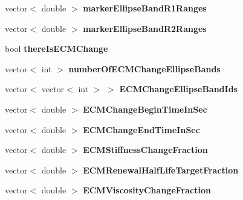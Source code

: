 \begin{DoxyCompactItemize}
\item 
\hypertarget{classSimulation_a4c294d56e7e1dacef4b4143ccfa445cf}{}vector$<$ double $>$ {\bfseries marker\+Ellipse\+Band\+R1\+Ranges}\label{classSimulation_a4c294d56e7e1dacef4b4143ccfa445cf}

\item 
\hypertarget{classSimulation_ac133c25002b7bc31291b013e36d5d861}{}vector$<$ double $>$ {\bfseries marker\+Ellipse\+Band\+R2\+Ranges}\label{classSimulation_ac133c25002b7bc31291b013e36d5d861}

\item 
\hypertarget{classSimulation_aa715adde27080a9c1e52f4428070d408}{}bool {\bfseries there\+Is\+E\+C\+M\+Change}\label{classSimulation_aa715adde27080a9c1e52f4428070d408}

\item 
\hypertarget{classSimulation_af267c5ade70459cfffcf17f2a01ad74b}{}vector$<$ int $>$ {\bfseries number\+Of\+E\+C\+M\+Change\+Ellipse\+Bands}\label{classSimulation_af267c5ade70459cfffcf17f2a01ad74b}

\item 
\hypertarget{classSimulation_a592e6f5c6ea02c01a23a8e0752c6a8be}{}vector$<$ vector$<$ int $>$ $>$ {\bfseries E\+C\+M\+Change\+Ellipse\+Band\+Ids}\label{classSimulation_a592e6f5c6ea02c01a23a8e0752c6a8be}

\item 
\hypertarget{classSimulation_a491d4e02eb8ee849281ed41721a8bba2}{}vector$<$ double $>$ {\bfseries E\+C\+M\+Change\+Begin\+Time\+In\+Sec}\label{classSimulation_a491d4e02eb8ee849281ed41721a8bba2}

\item 
\hypertarget{classSimulation_a63399a9c832ab5977afe9cde8dbf9992}{}vector$<$ double $>$ {\bfseries E\+C\+M\+Change\+End\+Time\+In\+Sec}\label{classSimulation_a63399a9c832ab5977afe9cde8dbf9992}

\item 
\hypertarget{classSimulation_ad729f9ede5ece82b3c71d888bc5fcdca}{}vector$<$ double $>$ {\bfseries E\+C\+M\+Stiffness\+Change\+Fraction}\label{classSimulation_ad729f9ede5ece82b3c71d888bc5fcdca}

\item 
\hypertarget{classSimulation_aa8b06059fa72efbca54b367c58e9447d}{}vector$<$ double $>$ {\bfseries E\+C\+M\+Renewal\+Half\+Life\+Target\+Fraction}\label{classSimulation_aa8b06059fa72efbca54b367c58e9447d}

\item 
\hypertarget{classSimulation_a99970cc906233445a2108536200fbf60}{}vector$<$ double $>$ {\bfseries E\+C\+M\+Viscosity\+Change\+Fraction}\label{classSimulation_a99970cc906233445a2108536200fbf60}


\end{DoxyCompactItemize}

